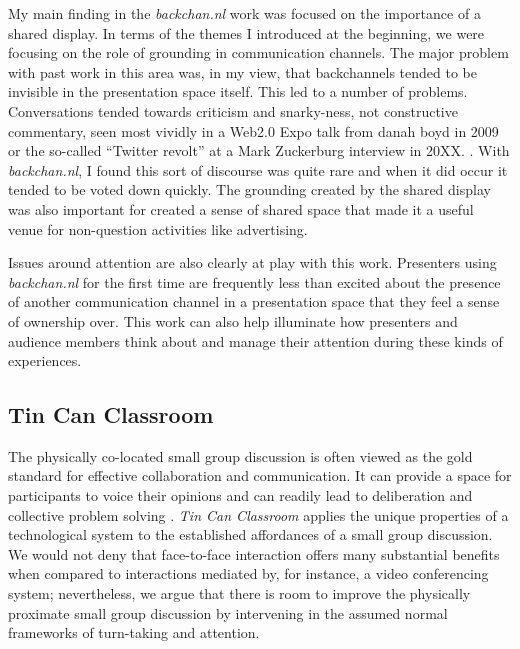 \documentclass{tufte-handout}
\begin{document}
My main finding in the \emph{backchan.nl} work was focused on the importance of a shared display. In terms of the themes I introduced at the beginning, we were focusing on the role of grounding in communication channels. The major problem with past work in this area was, in my view, that backchannels tended to be invisible in the presentation space itself. This led to a number of problems. Conversations tended towards criticism and snarky-ness, not constructive commentary, seen most vividly in a Web2.0 Expo talk from danah boyd in 2009 \citep{boyd:Yo36SNyj} or the so-called ``Twitter revolt'' at a Mark Zuckerburg interview in 20XX. \citep{Wallace:2008vb}. With \emph{backchan.nl}, I found this sort of discourse was quite rare and when it did occur it tended to be voted down quickly. The grounding created by the shared display was also important for created a sense of shared space that made it a useful venue for non-question activities like advertising. 

Issues around attention are also clearly at play with this work. Presenters using \emph{backchan.nl} for the first time are frequently less than excited about the presence of another communication channel in a presentation space that they feel a sense of ownership over. This work can also help illuminate how presenters and audience members think about and manage their attention during these kinds of experiences.



\subsection{Tin Can Classroom}


The physically co-located small group discussion is often viewed as the gold standard for effective collaboration and communication.  It can provide a space for participants to voice their opinions and can readily lead to deliberation and collective problem solving \citep{Burkhalter:2002vg}. \emph{Tin Can Classroom}  applies the unique properties of a technological system to the established affordances of a small group discussion. We would not deny that face-to-face interaction offers many substantial benefits when compared to interactions mediated by, for instance, a video conferencing system; nevertheless, we argue that there is room to improve the physically proximate small group discussion by intervening in the assumed normal frameworks of turn-taking and attention.
\end{document}
